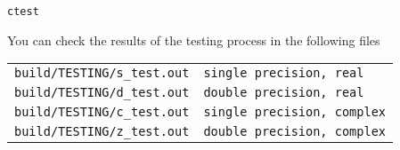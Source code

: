 \documentclass[11pt]{article}
\begin{document}
\begin{verbatim}
ctest
\end{verbatim}

You can check the results of the testing process in the following
files

\begin{center}
\begin{tabular}{ll}
\texttt{build/TESTING/s\_test.out} & \texttt{single precision, real}\\
\texttt{build/TESTING/d\_test.out} & \texttt{double precision, real}\\
\texttt{build/TESTING/c\_test.out} & \texttt{single precision, complex}\\
\texttt{build/TESTING/z\_test.out} & \texttt{double precision, complex}\\
\end{tabular}
\end{center}
\end{document}
